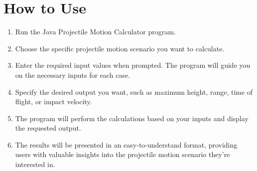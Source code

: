 \documentclass{article}
\begin{document}
\section*{How to Use}
\begin{enumerate}
  \item Run the Java Projectile Motion Calculator program.
  \item Choose the specific projectile motion scenario you want to calculate.
  \item Enter the required input values when prompted. The program will guide you on the necessary inputs for each case.
  \item Specify the desired output you want, such as maximum height, range, time of flight, or impact velocity.
  \item The program will perform the calculations based on your inputs and display the requested output.
  \item The results will be presented in an easy-to-understand format, providing users with valuable insights into the projectile motion scenario they're interested in.
\end{enumerate}
\end{document}
